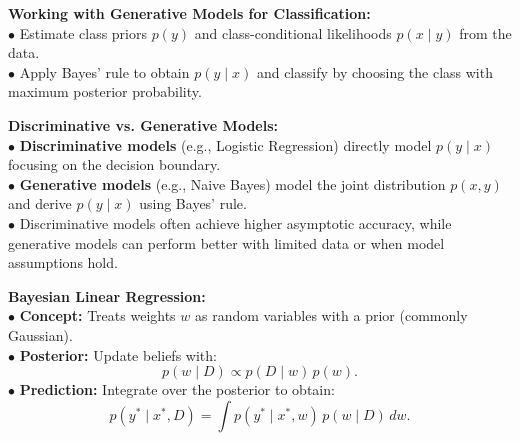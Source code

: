 \documentclass[10pt,landscape]{article}
\begin{document}
\begin{multicols}{3}
\begin{tcolorbox}[breakable, title=Naive Bayes \& Bayesian Linear Regression]
\vspace{1mm}
\textbf{Working with Generative Models for Classification:}\\[1mm]
\(\bullet\) Estimate class priors \(p(y)\) and class-conditional likelihoods \(p(x\mid y)\) from the data.\\
\(\bullet\) Apply Bayes' rule to obtain \(p(y\mid x)\) and classify by choosing the class with maximum posterior probability.

\vspace{1mm}
\textbf{Discriminative vs. Generative Models:}\\[1mm]
\(\bullet\) \textbf{Discriminative models} (e.g., Logistic Regression) directly model \(p(y\mid x)\) focusing on the decision boundary.\\
\(\bullet\) \textbf{Generative models} (e.g., Naive Bayes) model the joint distribution \(p(x,y)\) and derive \(p(y\mid x)\) using Bayes' rule.\\
\(\bullet\) Discriminative models often achieve higher asymptotic accuracy, while generative models can perform better with limited data or when model assumptions hold.

\vspace{1mm}
\textbf{Bayesian Linear Regression:}\\[1mm]
\(\bullet\) \textbf{Concept:} Treats weights \(w\) as random variables with a prior (commonly Gaussian).\\
\(\bullet\) \textbf{Posterior:} Update beliefs with:
\[
p(w\mid D) \propto p(D\mid w)\,p(w).
\]
\(\bullet\) \textbf{Prediction:} Integrate over the posterior to obtain:
\[
p(y^*\mid x^*,D)=\int p(y^*\mid x^*,w)\,p(w\mid D)\,dw.
\]
\end{tcolorbox}

\end{multicols}
\end{document}
